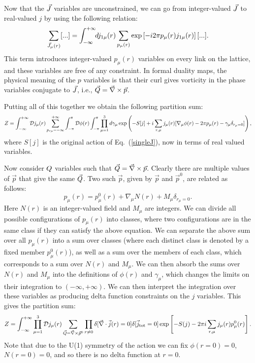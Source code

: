  Now that the $\vec{J}$ variables are unconstrained, we can go from integer-valued $\vec{J}$ to real-valued $j$ by using the following relation:
\begin{equation*}
\sum_{\vec{J}_{\mu}(r)}[...]=\int_{-\infty}^{+\infty}\!\! dj_{1\mu}(r) \sum_{p_{\mu}(r)} \exp\left[-i2\pi p_{\mu}(r)j_{1\mu}(r)\right][...].
\end{equation*} 
This term introduces integer-valued $p_{\mu}(r)$ variables on every link on the lattice, and these variables are free of any constraint.  In formal duality maps,\cite{PolyakovBook, Peskin1978, Dasgupta1981, FisherLee1989, LeeFisher1989, artphoton, short_range3} the physical meaning of the $p$ variables is that their curl gives vorticity in the phase variables conjugate to $\vec{J}$, i.e., ${\vec{Q}} = \vec{\nabla} \times \vec{p}$.

Putting all of this together we obtain the following partition sum:
\begin{equation}
Z=\int_{-\infty}^{+\infty}{\cal D}j_{\mu}(r) \sum_{p_{r\mu}=-\infty}^{+\infty}\int_{-\pi}^{\pi} {\cal D}\phi(r) \int_{-\pi}^{\pi} \prod_{\mu=1}^{3} d\gamma_{\mu} 
\exp\left(-S[j]+ i \sum_{r,\mu} j_\mu(r)[\nabla_\mu\phi(r) - 2\pi p_\mu(r)- \gamma_\mu \delta_{r_\mu=0}]\right),
\label{duality_mid}
\end{equation}
where $S[j]$ is the original action of Eq.~(\ref{singleJ}), now in terms of real valued variables. 

Now consider $Q$ variables such that $\vec{Q}=\vec{\nabla}\times\vec{p}$. Clearly there are multiple values of $\vec{p}$ that give the same $\vec{Q}$. Two such $\vec{p}$, given by $\vec{p}$ and $\vec{p}^0$, are related as follows:
\begin{equation}
p_\mu(r)=p^0_\mu(r)+\nabla_\mu N(r)+M_\mu \delta_{r_\mu=0}.
\end{equation}
Here $N(r)$ is an integer-valued field and $M_\mu$ are integers. We can divide all possible configurations of $p_\mu(r)$ into classes, where two configurations are in the same class if they can satisfy the above equation. We can separate the above sum over all $p_\mu(r)$ into a sum over classes (where each distinct class is denoted by a fixed member $p_\mu^0(r)$), as well as a sum over the members of each class, which corresponds to a sum over $N(r)$ and $M_\mu$. We can then absorb the sums over $N(r)$ and $M_\mu$ into the definitions of $\phi(r)$ and $\gamma_\mu$, which changes the limits on their integration to $(-\infty,+\infty)$. We can then interpret the integration over these variables as producing delta function constraints on the $j$ variables. This gives the partition sum:
\begin{equation}
Z=\int_{-\infty}^{+\infty}\prod_{\mu=1}^{3}{\cal D}j_{\mu}(r)\sum_{\vec{Q}=\vec{\nabla}\times \vec{p}^0} \prod_{r\neq0} \delta[\vec{\nabla}\cdot\vec{j}(r)=0]\delta[\vec{j}_{\rm tot}=0]  
\exp\left[-S(j)- 2\pi i \sum_{r,\mu} j_\mu(r) p^0_\mu(r)\right].
\label{Z3}
\end{equation}
Note that due to the U(1) symmetry of the action we can fix $\phi(r=0)=0$, $N(r=0)=0$, and so there is no delta function at $r=0$. 

